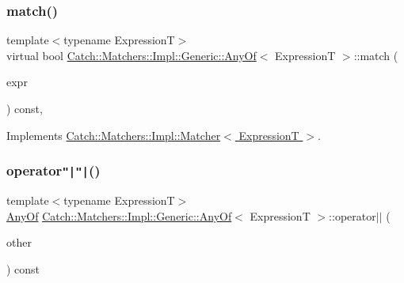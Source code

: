 \subsubsection{\texorpdfstring{match()}{match()}}
{\footnotesize\ttfamily template$<$typename ExpressionT$>$ \\
virtual bool \hyperlink{class_catch_1_1_matchers_1_1_impl_1_1_generic_1_1_any_of}{Catch\+::\+Matchers\+::\+Impl\+::\+Generic\+::\+Any\+Of}$<$ ExpressionT $>$\+::match (\begin{DoxyParamCaption}\item[{ExpressionT const \&}]{expr }\end{DoxyParamCaption}) const\hspace{0.3cm}{\ttfamily [inline]}, {\ttfamily [virtual]}}



Implements \hyperlink{struct_catch_1_1_matchers_1_1_impl_1_1_matcher_a8c1c5511ce1f3738a45e6901b558f583}{Catch\+::\+Matchers\+::\+Impl\+::\+Matcher$<$ Expression\+T $>$}.

\hypertarget{class_catch_1_1_matchers_1_1_impl_1_1_generic_1_1_any_of_a6dc9aee9a816f66ddc9de0c45c1c9ac1}{}\label{class_catch_1_1_matchers_1_1_impl_1_1_generic_1_1_any_of_a6dc9aee9a816f66ddc9de0c45c1c9ac1} 
\subsubsection{\texorpdfstring{operator\texttt{"|}\texttt{"|}()}{operator||()}}
{\footnotesize\ttfamily template$<$typename ExpressionT$>$ \\
\hyperlink{class_catch_1_1_matchers_1_1_impl_1_1_generic_1_1_any_of}{Any\+Of} \hyperlink{class_catch_1_1_matchers_1_1_impl_1_1_generic_1_1_any_of}{Catch\+::\+Matchers\+::\+Impl\+::\+Generic\+::\+Any\+Of}$<$ ExpressionT $>$\+::operator$\vert$$\vert$ (\begin{DoxyParamCaption}\item[{\hyperlink{struct_catch_1_1_matchers_1_1_impl_1_1_matcher}{Matcher}$<$ ExpressionT $>$ const \&}]{other }\end{DoxyParamCaption}) const\hspace{0.3cm}{\ttfamily [inline]}}

